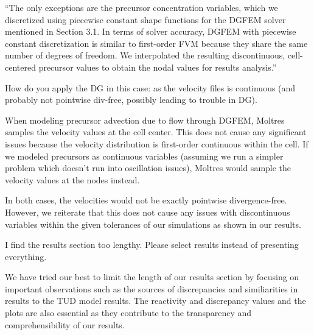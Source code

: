 \documentclass[answers,12pt]{exam}
\begin{document}
\begin{questions}
\begin{solution}
            ``The only exceptions are the precursor concentration variables,
which we discretized using piecewise constant shape functions for the 
\gls{DGFEM} solver mentioned in Section 3.1. In terms of solver accuracy,
\gls{DGFEM} with piecewise constant discretization is similar to first-order
\gls{FVM} because they share the same
number of degrees of freedom. We interpolated the resulting discontinuous,
cell-centered precursor values to obtain the nodal values for results
analysis.''
        \end{solution}

        \question How do you apply the DG in this case: as the
        velocity files is continuous (and probably not pointwise div-free,
        possibly leading to trouble in DG).
        \begin{solution}
            When modeling precursor advection due to flow through DGFEM,
            Moltres samples the velocity values at the cell center. This
            does not cause any significant issues because the velocity
            distribution is first-order continuous within the cell. If we
            modeled precursors as continuous variables (assuming we run a
            simpler problem which doesn't run into oscillation issues), Moltres
            would sample the velocity values at the nodes instead.
            
            In both cases, the velocities would not be exactly pointwise
            divergence-free. However, we reiterate that this does not cause
            any issues with discontinuous variables within the given tolerances
            of our simulations as shown in our results.
        \end{solution}
        \question I find the results section too lengthy. Please select results
        instead of presenting everything.
        \begin{solution}
        	We have tried our best to limit the length of our results section
        	by focusing on important observations such as the sources of
        	discrepancies and similiarities in results to the TUD model
        	results. The reactivity and discrepancy values and the plots are
        	also essential as they contribute to the transparency and
        	comprehensibility of our results.
        \end{solution}


\end{questions}
\end{document}
